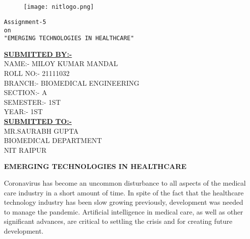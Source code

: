 \documentclass[12pt,a4paper]{report}
\begin{document}
 


\begin{center}
    \Large{}\\
\end{center}

\begin{center}
    \Large{}\\ 
\end{center}

\begin{figure}
    \centering
    \texttt{[image: nitlogo.png]}
\end{figure}

\begin{center}
   \huge{\texttt{Assignment-5\\ on\\ "EMERGING TECHNOLOGIES IN HEALTHCARE"}}
  \end{center}
 
  
\begin{center}
\textbf{\underline{SUBMITTED BY:-}}\\

NAME:- MILOY KUMAR MANDAL\\
ROLL NO:- 21111032\\
BRANCH:- BIOMEDICAL ENGINEERING\\
SECTION:- A\\
SEMESTER:- 1ST\\
YEAR:- 1ST\\

\textbf{\underline{SUBMITTED TO:-}}\\
MR.SAURABH GUPTA\\
BIOMEDICAL DEPARTMENT\\
NIT RAIPUR\\


 
\end{center} 
\clearpage

\begin{center}
  \huge{\textbf{EMERGING TECHNOLOGIES IN HEALTHCARE}}
\end{center}

Coronavirus has become an uncommon disturbance to all aspects of the medical care industry in a short amount of time. In spite of the fact that the healthcare technology industry has been slow growing previously, development was needed to manage the pandemic. Artificial intelligence in medical care, as well as other significant advances, are critical to settling the crisis and for creating future development.\par
\end{document}
